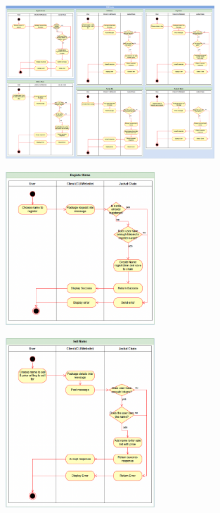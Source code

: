 \documentclass[a4paper]{article}
\begin{document}
\begin{figure}[!htbp]
\centering
\includegraphics[width=0.7\textwidth]{assets/rns1.png}
\end{figure}

\begin{figure}[!htbp]
\centering
\includegraphics[width=0.5\textwidth]{assets/rns2.png}
\end{figure}

\begin{figure}[!htbp]
\centering
\includegraphics[width=0.5\textwidth]{assets/rns3.png}
\end{figure}
\end{document}
